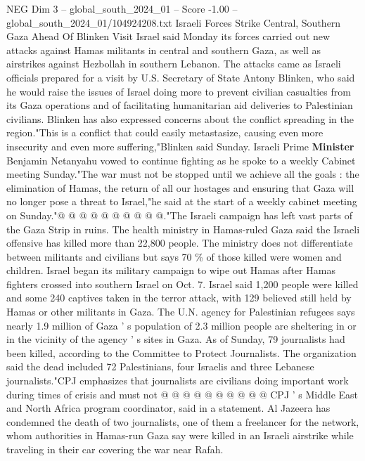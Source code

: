 \begin{textsample}{NEG Dim 3 – global\_south\_2024\_01 – Score -1.00 – global\_south\_2024\_01/104924208.txt}  \label{ex:f3_neg_077}
Israeli Forces Strike Central, Southern Gaza Ahead Of Blinken Visit Israel said Monday its forces carried out new attacks against Hamas militants in central and southern Gaza, as well as airstrikes against Hezbollah in southern Lebanon.
The attacks came as Israeli officials prepared for a visit by U.S.
Secretary of State Antony Blinken, who said he would raise the issues of Israel doing more to prevent civilian casualties from its Gaza operations and of facilitating humanitarian aid deliveries to Palestinian civilians.
Blinken has also expressed concerns about the conflict spreading in the region."This is a conflict that could easily metastasize, causing even more insecurity and even more suffering,"Blinken said Sunday.
Israeli Prime \textbf{Minister} Benjamin Netanyahu vowed to continue fighting as he spoke to a weekly Cabinet meeting Sunday."The war must not be stopped until we achieve all the goals : the elimination of Hamas, the return of all our hostages and ensuring that Gaza will no longer pose a threat to Israel,"he said at the start of a weekly cabinet meeting on Sunday."@ @ @ @ @ @ @ @ @ @."The Israeli campaign has left vast parts of the Gaza Strip in ruins.
The health ministry in Hamas-ruled Gaza said the Israeli offensive has killed more than 22,800 people.
The ministry does not differentiate between militants and civilians but says 70 \% of those killed were women and children.
Israel began its military campaign to wipe out Hamas after Hamas fighters crossed into southern Israel on Oct. 7.
Israel said 1,200 people were killed and some 240 captives taken in the terror attack, with 129 believed still held by Hamas or other militants in Gaza.
The U.N. agency for Palestinian refugees says nearly 1.9 million of Gaza ' s population of 2.3 million people are sheltering in or in the vicinity of the agency ' s sites in Gaza.
As of Sunday, 79 journalists had been killed, according to the Committee to Protect Journalists.
The organization said the dead included 72 Palestinians, four Israelis and three Lebanese journalists."CPJ emphasizes that journalists are civilians doing important work during times of crisis and must not @ @ @ @ @ @ @ @ @ @ CPJ ' s Middle East and North Africa program coordinator, said in a statement.
Al Jazeera has condemned the death of two journalists, one of them a freelancer for the network, whom authorities in Hamas-run Gaza say were killed in an Israeli airstrike while traveling in their car covering the war near Rafah.

\end{textsample}

